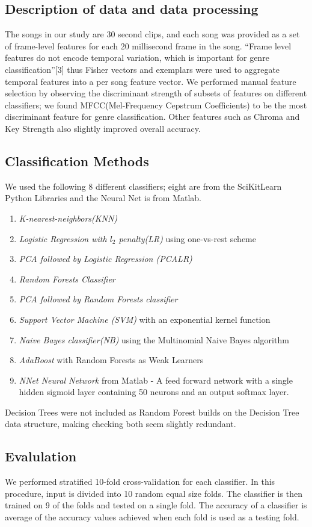 \documentclass{article} %
\begin{document}
\subsection{Description of data and data processing}
The songs in our study are 30 second clips, and each song was provided as a set of frame-level features for each 20 millisecond frame in the song. ``Frame level features do not encode temporal variation, which is important for genre classification''[3] thus Fisher vectors and exemplars were used to aggregate temporal features into a per song feature vector. 
We performed manual feature selection by observing the discriminant strength of subsets of features on different classifiers; we found MFCC(Mel-Frequency Cepstrum Coefficients) to be the most discriminant feature for genre classification. Other features such as Chroma and Key Strength also slightly improved overall accuracy. 

\subsection{Classification Methods}
We used the following 8 different classifiers; eight are from the SciKitLearn Python Libraries and the Neural Net is from Matlab. 
\begin{enumerate}
    \item \textit{K-nearest-neighbors(KNN)} 
    \item \textit{Logistic Regression with $l_2$ penalty(LR)} using one-vs-rest scheme 
    \item \textit{PCA followed by Logistic Regression (PCALR)}
    \item \textit{Random Forests Classifier}
    \item \textit{PCA followed by Random Forests classifier}
    \item \textit{Support Vector Machine (SVM)} with an exponential kernel function
    \item \textit{Naive Bayes classifier(NB)} using the Multinomial Naive Bayes algorithm
    \item \textit{AdaBoost} with Random Forests as Weak Learners
    \item \textit{NNet Neural Network} from Matlab - A feed forward network with a single hidden sigmoid layer containing 50 neurons and an output softmax layer.
\end{enumerate}
 Decision Trees were not included as Random Forest builds on the Decision Tree data structure, making checking both seem slightly redundant.
\subsection{Evalulation}
We performed stratified 10-fold cross-validation for each classifier. In this procedure, input is divided into 10 random equal size folds. The classifier is then trained on 9 of the folds and tested on a single fold. The accuracy of a classifier is average of the accuracy values achieved when each fold is used as a testing fold.
\end{document}

